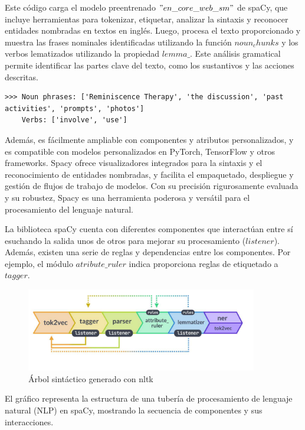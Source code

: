 Este código carga el modelo preentrenado $"en\_core\_web\_sm"$ de spaCy, que incluye herramientas para tokenizar, etiquetar, analizar la sintaxis y reconocer entidades nombradas en textos en inglés. Luego, procesa el texto proporcionado y muestra las frases nominales identificadas utilizando la función $noun_chunks$ y los verbos lematizados utilizando la propiedad $lemma\_$. Este análisis gramatical permite identificar las partes clave del texto, como los sustantivos y las acciones descritas.

\begin{lstlisting}[style=SpyderStyle, caption={Resultado de tokenización usando spaCy}, captionpos=b, label={lst:python},breaklines = true]
>>> Noun phrases: ['Reminiscence Therapy', 'the discussion', 'past activities', 'prompts', 'photos']
	Verbs: ['involve', 'use']
\end{lstlisting}

Además, es fácilmente ampliable con componentes y atributos personalizados, y es compatible con modelos personalizados en PyTorch, TensorFlow y otros frameworks. Spacy ofrece visualizadores integrados para la sintaxis y el reconocimiento de entidades nombradas, y facilita el empaquetado, despliegue y gestión de flujos de trabajo de modelos. Con su precisión rigurosamente evaluada y su robustez, Spacy es una herramienta poderosa y versátil para el procesamiento del lenguaje natural.

La biblioteca spaCy cuenta con diferentes componentes que interactúan entre sí esuchando la salida unos de otros para mejorar su procesamiento ($listener$). Además, existen una serie de reglas y dependencias entre los componentes. Por ejemplo, el módulo $atribute\_ruler$ indica proporciona reglas de etiquetado a $tagger$.

\begin{figure}[h]
	\centering
	\includegraphics[width=0.9\textwidth]{Imagenes/spaCy}
	\caption{Árbol sintáctico generado con nltk}
	\label{fig:1}
\end{figure}

El gráfico representa la estructura de una tubería de procesamiento de lenguaje natural (NLP) en spaCy, mostrando la secuencia de componentes y sus interacciones.

